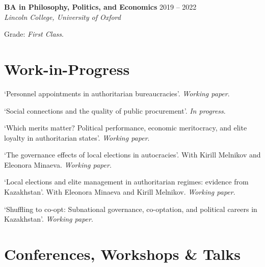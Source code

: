 \documentclass[10pt, a4paper]{article}
\begin{document}
\begin{samepage}
  \textbf{BA in Philosophy, Politics, and Economics} \hfill 2019 -- 2022\\
  \textit{Lincoln College, University of Oxford}

Grade: \textit{First Class}.
\end{samepage}

\section{Work-in-Progress}

`Personnel appointments in authoritarian bureaucracies'. \textit{Working paper}.

`Social connections and the quality of public procurement'. \textit{In progress}.

`Which merits matter? Political performance, economic meritocracy, and elite loyalty in authoritarian states'. \textit{Working paper}.

`The governance effects of local elections in autocracies'. With Kirill Melnikov and Eleonora Minaeva. \textit{Working paper}.

`Local elections and elite management in authoritarian regimes: evidence from Kazakhstan'. With Eleonora Minaeva and Kirill Melnikov.  \textit{Working paper}.

`Shuffling to co-opt: Subnational governance, co-optation, and political careers in Kazakhstan'. \textit{Working paper}.

\section{Conferences, Workshops \& Talks }





\end{document}
